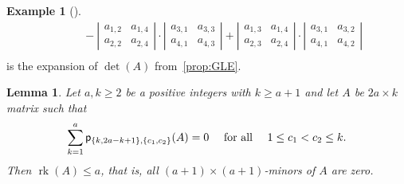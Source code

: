 \documentclass[11pt]{amsart}
\newtheorem{lemma}[theorem]{Lemma}
\theoremstyle{remark}
\theoremstyle{remark}
\theoremstyle{definition}
\theoremstyle{definition}
\theoremstyle{definition}
\newtheorem{eg_no_qed}[theorem]{Example}
\newenvironment{ex}[1][]{\begin{eg_no_qed}[#1]\renewcommand{\qedsymbol}{$\Diamond$}\pushQED{\qed}}{\popQED\end{eg_no_qed}}
\numberwithin{equation}{section}
\newcommand{\rk}{\operatorname{rk}}
\newcommand{\pl}{\mathsf{p}}
\begin{document}
\begin{ex}
\begin{align*}
& \quad \quad  -   \left| \begin{matrix} a_{1,2} & a_{1,4}\\ a_{2,2} & a_{2,4} \end{matrix} \right| \cdot \left| \begin{matrix} a_{3,1} & a_{3,3}\\ a_{4,1} & a_{4,3} \end{matrix} \right| +  \left| \begin{matrix} a_{1,3} & a_{1,4}\\ a_{2,3} & a_{2,4} \end{matrix} \right| \cdot \left| \begin{matrix} a_{3,1} & a_{3,2}\\ a_{4,1} & a_{4,2} \end{matrix} \right| \\
\end{align*}
is the expansion of $\det(A)$ from~\eqref{prop:GLE}.
\end{ex}


\begin{lemma}\label{lem.rankcond} Let $a,k\geq 2$ be a positive integers with $k\geq a+1$ and let $A$ be $2a\times k$ matrix such that 
\begin{equation}\label{vanmins}
\sum_{k=1}^a \pl_{\{k,2a-k+1\},\{c_1,c_2\}}(A)=0 \quad \textup{ for all } \quad 1\leq c_1<c_2\leq k.
\end{equation}
Then $\rk(A)\leq a$, that is, all $(a+1)\times(a+1)$-minors of $A$ are zero.
\end{lemma}
\end{document}
